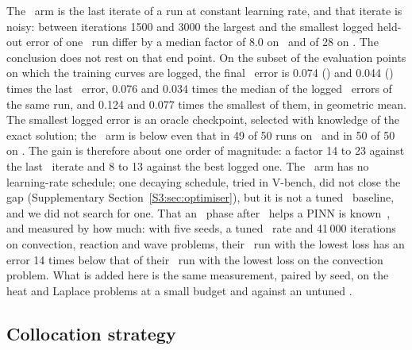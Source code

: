 The \Adam\ arm is the last iterate of a run at constant learning rate, and that iterate is
noisy: between iterations 1500 and 3000 the largest and the smallest logged held-out error of
one \Adam\ run differ by a median factor of 8.0 on \PH\ and of 28 on \PLtwo. The conclusion
does not rest on that end point. On the subset of the evaluation points on which the training
curves are logged, the final \AdamLBFGS\ error is 0.074 (\PH) and 0.044 (\PLtwo) times the
last \Adam\ error, 0.076 and 0.034 times the median of the logged \Adam\ errors of the same
run, and 0.124 and 0.077 times the smallest of them, in geometric mean. The smallest logged
error is an oracle checkpoint, selected with knowledge of the exact solution; the
\AdamLBFGS\ arm is below even that in 49 of 50 runs on \PH\ and in 50 of 50 on \PLtwo. The
gain is therefore about one order of magnitude: a factor 14 to 23 against the last \Adam\
iterate and 8 to 13 against the best logged one. The \Adam\ arm has no learning-rate
schedule; one decaying schedule, tried in \textsf{V-bench}, did not close the gap
(Supplementary Section~\ref{S3:sec:optimiser}), but it is not a tuned \Adam\ baseline, and we
did not search for one.
That an \LBFGS\ phase after \Adam\ helps a PINN is known~\citep{lu2021}, and
\citet{rathore2024} measured by how much: with five seeds, a tuned \Adam\ rate and
41\,000 iterations on convection, reaction and wave problems, their \AdamLBFGS\ run with the
lowest loss has an error 14 times below that of their \Adam\ run with the lowest loss on the
convection problem. What
is added here is the same measurement, paired by seed, on the heat and Laplace problems
at a small budget and against an untuned \Adam.

\subsection{Collocation strategy}\label{s4_lowdim:sec:strategy}

